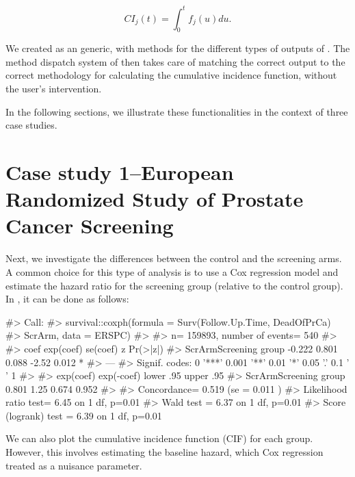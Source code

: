 \documentclass[
]{jss}
\begin{document}
\[ CI_j(t) = \int_0^t f_j(u)du.\]

We created  as an  generic, with methods for
the different types of outputs of . The method
dispatch system of  then takes care of matching the correct
output to the correct methodology for calculating the cumulative
incidence function, without the user's intervention.

In the following sections, we illustrate these functionalities in the
context of three case studies.

\hypertarget{case-study-1european-randomized-study-of-prostate-cancer-screening}{%
\section{Case study 1--European Randomized Study of Prostate Cancer
Screening}\label{case-study-1european-randomized-study-of-prostate-cancer-screening}}

Next, we investigate the differences between the control and the
screening arms. A common choice for this type of analysis is to use a
Cox regression model and estimate the hazard ratio for the screening
group (relative to the control group). In , it can be done
as follows:

\begin{CodeChunk}

\begin{CodeOutput}
#> Call:
#> survival::coxph(formula = Surv(Follow.Up.Time, DeadOfPrCa) ~ 
#>     ScrArm, data = ERSPC)
#> 
#>   n= 159893, number of events= 540 
#> 
#>                         coef exp(coef) se(coef)     z Pr(>|z|)  
#> ScrArmScreening group -0.222     0.801    0.088 -2.52    0.012 *
#> ---
#> Signif. codes:  0 '***' 0.001 '**' 0.01 '*' 0.05 '.' 0.1 ' ' 1
#> 
#>                       exp(coef) exp(-coef) lower .95 upper .95
#> ScrArmScreening group     0.801       1.25     0.674     0.952
#> 
#> Concordance= 0.519  (se = 0.011 )
#> Likelihood ratio test= 6.45  on 1 df,   p=0.01
#> Wald test            = 6.37  on 1 df,   p=0.01
#> Score (logrank) test = 6.39  on 1 df,   p=0.01
\end{CodeOutput}
\end{CodeChunk}

We can also plot the cumulative incidence function (CIF) for each group.
However, this involves estimating the baseline hazard, which Cox
regression treated as a nuisance parameter.
\end{document}
